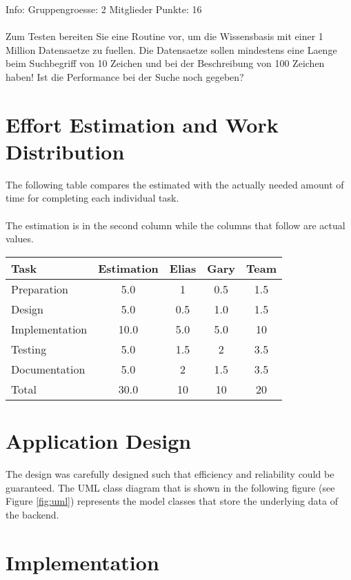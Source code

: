 \documentclass[11pt, a4paper]{article}
\begin{document}
Info: Gruppengroesse: 2 Mitglieder Punkte: 16
\\\\
Zum Testen bereiten Sie eine Routine vor, um die Wissensbasis mit einer 1
Million Datensaetze zu fuellen. Die Datensaetze sollen mindestens eine Laenge
beim Suchbegriff von 10 Zeichen und bei der Beschreibung von 100 Zeichen haben!
Ist die Performance bei der Suche noch gegeben?

\section{Effort Estimation and Work Distribution}

The following table compares the estimated with the actually needed
amount of time for completing each individual task.
\\\\
The estimation is in the second column while the columns that follow
are actual values.

\parskip 12pt
\begin{tabular} {| l | c | c | c | c |}
	\hline
	Task & Estimation & Elias & Gary & Team	\\ \hline \hline
	Preparation & 5.0 & 1 &  0.5 & 1.5		\\ \hline
	Design & 5.0  & 0.5 &	1.0  & 1.5			\\ \hline
	Implementation & 10.0 & 5.0 & 5.0 & 10 \\ \hline
	Testing & 5.0	& 1.5	& 2 & 3.5 \\ \hline
	Documentation	& 5.0 & 2 & 1.5 & 3.5	\\ \hline 
	Total	& 30.0	& 10 & 10 & 20 \\
	\hline
\end{tabular}

\section{Application Design}

The design was carefully designed such that efficiency and reliability could be
guaranteed. The UML class diagram that is shown in the following figure (see
Figure \ref{fig:uml}) represents the model classes that store the underlying
data of the backend. 


\section{Implementation}
\end{document}
